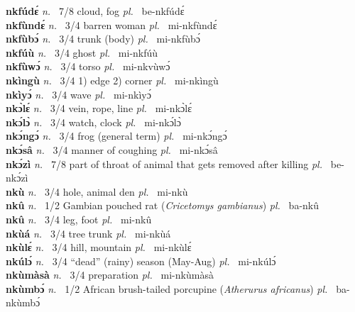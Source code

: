 {\bfseries nkfúdɛ́}  {\itshape n.~} 7/8 cloud, fog {\itshape pl.~} be-nkfúdɛ́    \\ 
{\bfseries nkfùndɛ́}  {\itshape n.~} 3/4 barren woman {\itshape pl.~} mi-nkfùndɛ́    \\ 
{\bfseries nkfùbɔ́}  {\itshape n.~} 3/4 trunk (body) {\itshape pl.~} mi-nkfùbɔ́    \\ 
{\bfseries nkfúù}  {\itshape n.~} 3/4 ghost {\itshape pl.~} mi-nkfúù    \\ 
{\bfseries nkfùwɔ́}  {\itshape n.~} 3/4 torso  {\itshape pl.~} mi-nkvùwɔ́    \\ 
{\bfseries nkìngù}  {\itshape n.~} 3/4 1) edge 2) corner {\itshape pl.~} mi-nkìngù    \\ 
{\bfseries nkìyɔ́}  {\itshape n.~} 3/4 wave {\itshape pl.~} mi-nkìyɔ́    \\ 
{\bfseries nkɔ̀lɛ́}  {\itshape n.~} 3/4 vein, rope, line {\itshape pl.~} mi-nkɔ̀lɛ́    \\ 
{\bfseries nkɔ́lɔ̀}  {\itshape n.~} 3/4 watch, clock {\itshape pl.~} mi-nkɔ́lɔ̀    \\ 
{\bfseries nkɔ́ngɔ́}  {\itshape n.~} 3/4 frog (general term) {\itshape pl.~} mi-nkɔ́ngɔ́    \\ 
{\bfseries nkɔ́sâ}  {\itshape n.~} 3/4 manner of coughing {\itshape pl.~} mi-nkɔ́sâ    \\ 
{\bfseries nkɔ́zì}  {\itshape n.~} 7/8 part of throat of animal that gets removed after killing {\itshape pl.~} be-nkɔ́zì    \\ 
{\bfseries nkù}  {\itshape n.~} 3/4 hole, animal den {\itshape pl.~} mi-nkù    \\ 
{\bfseries nkû}  {\itshape n.~} 1/2 Gambian pouched rat ({\itshape Cricetomys gambianus}) {\itshape pl.~} ba-nkû    \\ 
{\bfseries nkû}  {\itshape n.~} 3/4 leg, foot {\itshape pl.~} mi-nkû    \\ 
{\bfseries nkùá}  {\itshape n.~} 3/4 tree trunk {\itshape pl.~} mi-nkùá    \\ 
{\bfseries nkùlɛ́}  {\itshape n.~} 3/4 hill, mountain {\itshape pl.~} mi-nkùlɛ́    \\ 
{\bfseries nkúlɔ́}  {\itshape n.~} 3/4 ``dead'' (rainy) season (May-Aug) {\itshape pl.~} mi-nkúlɔ́    \\ 
{\bfseries nkùmàsà}  {\itshape n.~} 3/4 preparation {\itshape pl.~} mi-nkùmàsà    \\ 
{\bfseries nkùmbɔ́}  {\itshape n.~} 1/2 African brush-tailed porcupine ({\itshape Atherurus africanus}) {\itshape pl.~} ba-nkùmbɔ́    \\ 
